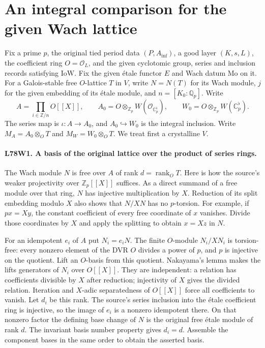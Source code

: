 \section{An integral comparison for the given Wach lattice}

Fix a prime $p$, the original tied period data $(P,A_{\inf})$, a good
layer $(K,s,L)$, the coefficient ring $O=\mathcal O_L$, and the given
cyclotomic group, series and inclusion records satisfying
$\mathrm{IoW}$. Fix the given \'etale functor $E$ and Wach datum
$\mathrm{Mo}$ on it. For a Galois-stable free $O$-lattice $T$ in
$V$, write $N=N(T)$ for its Wach module, $j$ for the given embedding of
its \'etale module, and $n=[K_0:\mathbb Q_p]$. Write
\[
 A=\prod_{i\in\mathbb Z/n}\!O[[X]],\qquad
 A_0=O\otimes_{\mathbb Z_p}W(\mathcal O_{\mathbb C_p^\flat}),
 \qquad W_0=O\otimes_{\mathbb Z_p}W(\mathbb C_p^\flat).
\]
The series map is $\iota:A\to A_0$, and $A_0\hookrightarrow W_0$
is the integral inclusion. Write $M_A=A_0\otimes_O T$ and
$M_W=W_0\otimes_O T$. We treat first a crystalline $V$.

\paragraph{L78W1. A basis of the original lattice over the product of series rings.}
The Wach module $N$ is free over $A$ of rank $d=\operatorname{rank}_O T$.
Here is how the source's weaker projectivity over $\mathbb Z_p[[X]]$
suffices. As a direct summand of a free module over that ring, $N$
has injective multiplication by $X$. Reduction of its split
embedding modulo $X$ also shows that $N/XN$ has no $p$-torsion.
For example, if $p x=Xy$, the constant coefficient of every free
coordinate of $x$ vanishes. Divide those coordinates by $X$ and
apply the splitting to obtain $x=Xz$ in $N$.

For an idempotent $e_i$ of $A$ put $N_i=e_iN$. The finite $O$-module
$N_i/XN_i$ is torsion-free: every nonzero element of the DVR $O$
divides a power of $p$, and $p$ is injective on the quotient.
Lift an $O$-basis from this quotient. Nakayama's lemma makes the
lifts generators of $N_i$ over $O[[X]]$. They are independent:
a relation has coefficients divisible by $X$ after reduction;
injectivity of $X$ gives the divided relation. Iteration and
$X$-adic separatedness of $O[[X]]$ force all coefficients to vanish.
Let $d_i$ be this rank. The source's series inclusion into the
\'etale coefficient ring is injective, so the image of $e_i$ is a
nonzero idempotent there. On that nonzero factor the defining
base change of $N$ is the original free \'etale module of rank $d$.
The invariant basis number property gives $d_i=d$. Assemble the
component bases in the same order to obtain the asserted basis.

